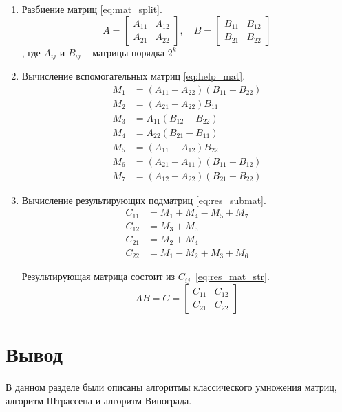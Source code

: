 \begin{enumerate}
	\item Разбиение матриц \eqref{eq:mat_split}.
	\begin{equation}
		\label{eq:mat_split}
	A = \begin{bmatrix} A_{11} & A_{12} \\ A_{21} & A_{22} \end{bmatrix}, \quad
	B = \begin{bmatrix} B_{11} & B_{12} \\ B_{21} & B_{22} \end{bmatrix}
	\end{equation}, где $A_{ij}$ и $B_{ij}$ -- матрицы порядка $2^{k}$
	
	\item Вычисление вспомогательных матриц \eqref{eq:help_mat}.
	\begin{equation}
		\label{eq:help_mat}
	\begin{aligned}
		M_1 &= (A_{11} + A_{22})(B_{11} + B_{22}) \\
		M_2 &= (A_{21} + A_{22})B_{11} \\
		M_3 &= A_{11}(B_{12} - B_{22}) \\
		M_4 &= A_{22}(B_{21} - B_{11}) \\
		M_5 &= (A_{11} + A_{12})B_{22} \\
		M_6 &= (A_{21} - A_{11})(B_{11} + B_{12}) \\
		M_7 &= (A_{12} - A_{22})(B_{21} + B_{22})
	\end{aligned}
	\end{equation}
	
	\item Вычисление результирующих подматриц \eqref{eq:res_submat}.
	\begin{equation}
		\label{eq:res_submat}
	\begin{aligned}
		C_{11} &= M_1 + M_4 - M_5 + M_7 \\
		C_{12} &= M_3 + M_5 \\
		C_{21} &= M_2 + M_4 \\
		C_{22} &= M_1 - M_2 + M_3 + M_6
	\end{aligned}
	\end{equation}
		
	Результирующая матрица состоит из $C_{ij}$~\eqref{eq:res_mat_str}.
	\begin{equation}
		\label{eq:res_mat_str}
		AB = C = \begin{bmatrix} C_{11} & C_{12} \\ C_{21} & C_{22} \end{bmatrix}
	\end{equation}
		
\end{enumerate}


\section*{Вывод}
В данном разделе были описаны алгоритмы классического умножения матриц, алгоритм Штрассена и алгоритм Винограда.